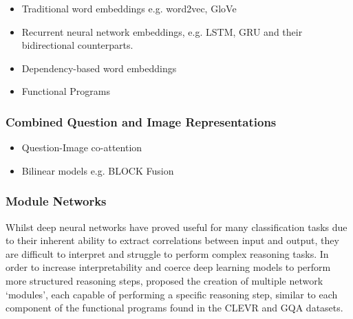 \begin{itemize}
    \item Traditional word embeddings e.g. word2vec, GloVe
    \item Recurrent neural network embeddings, e.g. LSTM, GRU and their bidirectional counterparts. 
    \item Dependency-based word embeddings \cite{levy2014dependency}
    \item Functional Programs
\end{itemize}

\subsubsection*{Combined Question and Image Representations}

\begin{itemize}
    \item Question-Image co-attention \cite{lu2016hierarchical}
    \item Bilinear models e.g. BLOCK Fusion \cite{ben2019block}
\end{itemize}


\subsubsection*{Module Networks}

Whilst deep neural networks have proved useful for many classification tasks due to their inherent ability to extract correlations between input and output, they are difficult to interpret and struggle to perform complex reasoning tasks. In order to increase interpretability and coerce deep learning models to perform more structured reasoning steps, \citeauthor{andreas2016neural} proposed the creation of multiple network `modules', each capable of performing a specific reasoning step, similar to each component of the functional programs found in the CLEVR \cite{johnson2017clevr} and GQA \cite{hudson2019gqa} datasets.

\vspace{\baselineskip}

